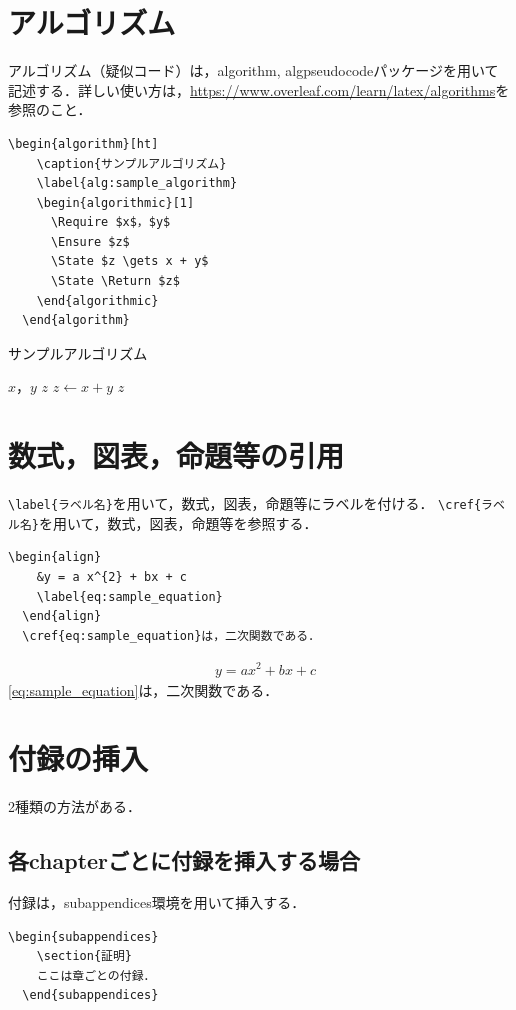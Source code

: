 \documentclass[../main/main]{subfiles}
\begin{document}
\newpage
\section{アルゴリズム}
アルゴリズム（疑似コード）は，algorithm, algpseudocodeパッケージを用いて記述する．詳しい使い方は，\url{https://www.overleaf.com/learn/latex/algorithms}を参照のこと．
\begin{lstlisting}[language={[latex]TeX}]
  \begin{algorithm}[ht]
    \caption{サンプルアルゴリズム}
    \label{alg:sample_algorithm}
    \begin{algorithmic}[1]
      \Require $x$，$y$
      \Ensure $z$
      \State $z \gets x + y$
      \State \Return $z$
    \end{algorithmic}
  \end{algorithm}
\end{lstlisting}
\begin{algorithm}[!ht]
  \caption{サンプルアルゴリズム}
  \label{alg:sample_algorithm}
  \begin{algorithmic}[1]
    \Require $x$，$y$
    \Ensure $z$
    \State $z \gets x + y$
    \State \Return $z$
  \end{algorithmic}
\end{algorithm}


\newpage
\section{数式，図表，命題等の引用}
\verb|\label{ラベル名}|を用いて，数式，図表，命題等にラベルを付ける．
\verb|\cref{ラベル名}|を用いて，数式，図表，命題等を参照する．
\begin{lstlisting}[language={[latex]TeX}]
  \begin{align}
    &y = a x^{2} + bx + c
    \label{eq:sample_equation}
  \end{align}
  \cref{eq:sample_equation}は，二次関数である．
\end{lstlisting}
\begin{align}
  &y = a x^{2} + bx + c
  \label{eq:sample_equation}
\end{align}
\cref{eq:sample_equation}は，二次関数である．

\newpage
\section{付録の挿入}
2種類の方法がある．
\subsection{各chapterごとに付録を挿入する場合}
付録は，subappendices環境を用いて挿入する．
\begin{lstlisting}[language={[latex]TeX}]
  \begin{subappendices}
    \section{証明}
    ここは章ごとの付録．
  \end{subappendices}
\end{lstlisting}
\end{document}
